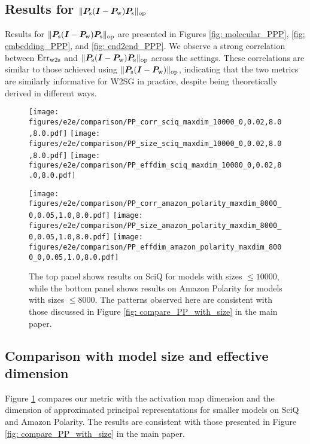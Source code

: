 \subsection{Results for $\lVert  {\bm{P}}_{\text{s}}({\bm{I}}-{\bm{P}}_{\text{w}}){\bm{P}}_{\text{s}}  \rVert_{\mathrm{op}}$}\label{apdx: PPP}

Results for $\lVert {\bm{P}}_{\text{s}}({\bm{I}}-{\bm{P}}_{\text{w}}){\bm{P}}_{\text{s}} \rVert_{\mathrm{op}}$ are presented in Figures \ref{fig: molecular_PPP}, \ref{fig: embedding_PPP}, and \ref{fig: end2end_PPP}. We observe a strong correlation between $\text{Err}_{\text{w2s}}$ and $\lVert {\bm{P}}_{\text{s}}({\bm{I}}-{\bm{P}}_{\text{w}}){\bm{P}}_{\text{s}} \rVert_{\mathrm{op}}$ across the settings. These correlations are similar to those achieved using $\lVert {\bm{P}}_{\text{s}}({\bm{I}}-{\bm{P}}_{\text{w}}) \rVert_{\mathrm{op}}$, indicating that the two metrics are similarly informative for W2SG in practice, despite being theoretically derived in different ways.


\begin{figure}[!t]
    \centering
\texttt{[image: figures/e2e/comparison/PP\_corr\_sciq\_maxdim\_10000\_0,0.02,8.0,8.0.pdf]}
\texttt{[image: figures/e2e/comparison/PP\_size\_sciq\_maxdim\_10000\_0,0.02,8.0,8.0.pdf]}
\texttt{[image: figures/e2e/comparison/PP\_effdim\_sciq\_maxdim\_10000\_0,0.02,8.0,8.0.pdf]}

\texttt{[image: figures/e2e/comparison/PP\_corr\_amazon\_polarity\_maxdim\_8000\_0,0.05,1.0,8.0.pdf]}
\texttt{[image: figures/e2e/comparison/PP\_size\_amazon\_polarity\_maxdim\_8000\_0,0.05,1.0,8.0.pdf]}
\texttt{[image: figures/e2e/comparison/PP\_effdim\_amazon\_polarity\_maxdim\_8000\_0,0.05,1.0,8.0.pdf]}
\vspace{-.2cm}
    \caption{%
     {The top panel shows results on SciQ for models with sizes $\leq 10000$, while the bottom panel shows results on Amazon Polarity for models with sizes $\leq 8000$. The patterns observed here are consistent with those discussed in Figure \ref{fig: compare_PP_with_size} in the main paper. }  }
    \label{fig: compare_PP_with_size_apdx}
    \vspace{-.5cm}
\end{figure}


\subsection{Comparison with model size and effective dimension}\label{apdx: compare_size}

Figure \ref{fig: compare_PP_with_size_apdx} compares our metric with the activation map dimension and the dimension of approximated principal representations for smaller models on SciQ and Amazon Polarity. The results are consistent with those presented in Figure \ref{fig: compare_PP_with_size} in the main paper.

